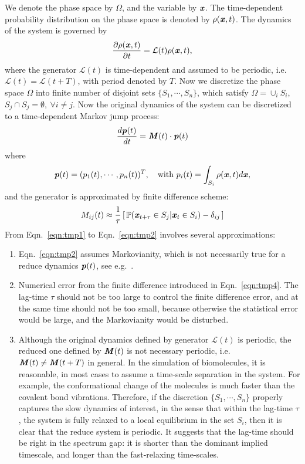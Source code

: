 \documentclass[aps, pre, preprint,unsortedaddress,a4paper,onecolumn]{revtex4}
\newcommand{\vect}[1]{\textbf{\textit{#1}}}
\newcommand{\ml}[0]{\mathcal {L}}
\newcommand{\mbp}[0]{\mathbb {P}}
\begin{document}
We denote the phase space by $\Omega$, and the variable by $\vect
x$. The time-dependent probability distribution on the phase space is
denoted by $\rho(\vect x, t)$. The dynamics of the system is governed
by
\begin{align}
  \label{eqn:tmp1}
  \frac{\partial \rho(\vect x, t)}{\partial t} = \ml(t) \rho(\vect x,t),
\end{align}
where the generator $\ml(t)$ is time-dependent and assumed to be
periodic, i.e.~$\ml(t) = \ml(t+T)$, with period denoted by $T$.  Now
we discretize the phase space $\Omega$ into finite number of disjoint
sets $\{ S_1, \cdots, S_n\}$, which satisfy $\Omega = \cup_i S_i$,
$S_j\cap S_j = \emptyset,\ \forall i\neq j$.
Now the original dynamics of the system can be discretized to a time-dependent
Markov jump process:
\begin{align}
  \label{eqn:tmp2}
  \frac{d\vect p(t)}{dt} = \vect M(t)\cdot \vect p(t)
\end{align}
where
\begin{align}
  \vect p(t) = (p_1(t), \cdots, p_n(t))^T, \quad \textrm{with}\ p_i(t) = \int_{S_i} \rho(\vect x,t)d\vect x,
\end{align}
and the generator is approximated by finite difference scheme:
\begin{align}
  \label{eqn:tmp4}
  M_{ij}(t) \approx \frac{1}{\tau} \,[\, \mbp (\vect x_{t+\tau} \in S_j \vert \vect x_{t} \in S_i) - \delta_{ij} \,]
\end{align}
From Eqn.~\eqref{eqn:tmp1} to Eqn.~\eqref{eqn:tmp2} involves several
approximations:
\begin{enumerate}
\item Eqn.~\eqref{eqn:tmp2} assumes Markovianity, which is not
  necessarily true for a reduce dynamics $\vect p(t)$, see e.g.~\cite{prinz2011markov}.
\item Numerical error from the finite difference introduced in
  Eqn.~\eqref{eqn:tmp4}. The lag-time $\tau$ should not be too large
  to control the finite difference error, and at the same time should
  not be too small, because otherwise the statistical error would be
  large, and the Markovianity would be disturbed.
\item Although the original dynamics defined by generator $\ml(t)$ is
  periodic, the reduced one defined by $\vect M(t)$ is not necessary
  periodic, i.e.~$\vect M(t) \neq \vect M(t+T)$ in general.  In the
  simulation of biomolecules, it is reasonable, in most cases to
  assume a time-scale separation in the system. For example, the
  conformational change of the molecules is much faster than the
  covalent bond vibrations. Therefore, if the discretion $\{ S_1,
  \cdots, S_n\}$ properly captures the slow dynamics of interest, in
  the sense that within the lag-time $\tau$, the system is fully
  relaxed to a local equilibrium in the set $S_i$, then it is clear
  that the reduce system is periodic. It suggests that the lag-time
  should be right in the spectrum gap: it is shorter than the dominant
  implied timescale, and longer than the fast-relaxing time-scales.
\end{enumerate}
\end{document}
